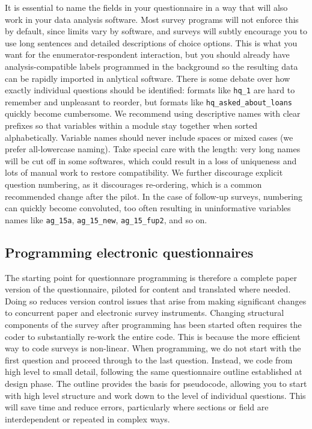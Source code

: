 It is essential to name the fields in your questionnaire
in a way that will also work in your data analysis software.
Most survey programs will not enforce this by default,
since limits vary by software,
and surveys will subtly encourage you to use long sentences
and detailed descriptions of choice options.
This is what you want for the enumerator-respondent interaction,
but you should already have analysis-compatible labels programmed in the background
so the resulting data can be rapidly imported in anlytical software.
There is some debate over how exactly individual questions should be identified:
formats like \texttt{hq\_1} are hard to remember and unpleasant to reorder,
but formats like \texttt{hq\_asked\_about\_loans} quickly become cumbersome.
We recommend using descriptive names with clear prefixes so that variables
within a module stay together when sorted alphabetically.
Variable names should never include spaces or mixed cases
(we prefer all-lowercase naming).
Take special care with the length: very long names will be cut off in some softwares,
which could result in a loss of uniqueness and lots of manual work to restore compatibility.
We further discourage explicit question numbering, as it discourages re-ordering,
which is a common recommended change after the pilot.
In the case of follow-up surveys, numbering can quickly become convoluted,
too often resulting in uninformative variables names like
\texttt{ag\_15a}, \texttt{ag\_15\_new}, \texttt{ag\_15\_fup2}, and so on.

\subsection{Programming electronic questionnaires}

The starting point for questionnare programming is therefore a complete paper version of the questionnaire,
piloted for content and translated where needed.
Doing so reduces version control issues that arise from making significant changes
to concurrent paper and electronic survey instruments.
Changing structural components of the survey after programming has been started
often requires the coder to substantially re-work the entire code.
This is because the more efficient way to code surveys is non-linear.
When programming, we do not start with the first question and proceed through to the last question.
Instead, we code from high level to small detail,
following the same questionnaire outline established at design phase.
The outline provides the basis for pseudocode,
allowing you to start with high level structure and work down to the level of individual questions.
This will save time and reduce errors,
particularly where sections or field are interdependent or repeated in complex ways.

